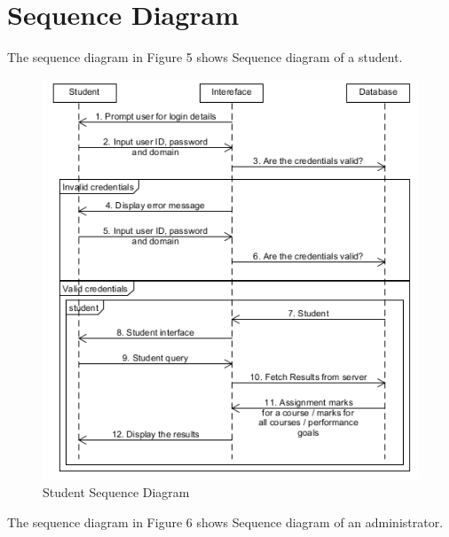 	\newpage
	\section{Sequence Diagram}
	
	The sequence diagram in Figure 5 shows Sequence diagram of a student.  
	
	
	\begin{center}
		\begin{figure}[h]
			\centering
			\includegraphics[trim={0cm 0cm 0cm 0cm },clip,scale = 1.3]{StudentSequence}
			\caption{Student Sequence Diagram}
		\end{figure}
	\end{center}
	\newpage
	
	
	The sequence diagram in Figure 6 shows Sequence diagram of an administrator.  
	
